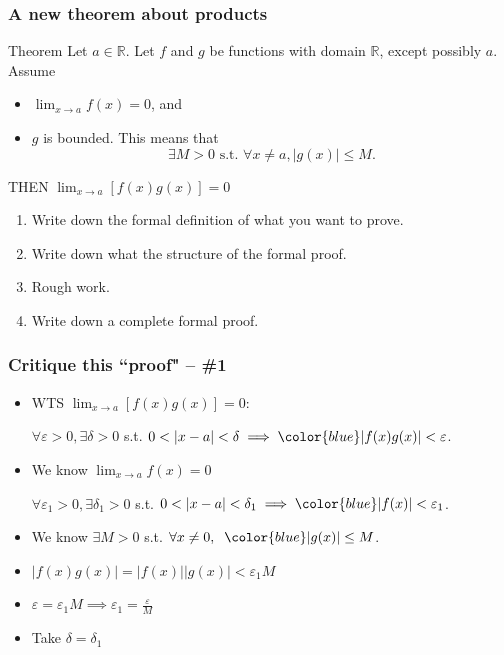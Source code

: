 \begin{frame}[t]
	\frametitle{A new theorem about products}
	\fontsize{13}{13}\selectfont
	\begin{block}{Theorem}
		Let $a \in \mathbb{R}$. Let $f$ and $g$ be functions with domain
		$\mathbb{R}$, except possibly $a$. Assume
		\begin{itemize}
			\item $\displaystyle \lim_{x \to a}f(x) = 0$, and

			\item $g$ is bounded. This means that
				\[
					\exists M >0 \text{ s.t. }\forall x \neq a, |g(x)| \leq M.
				\]
		\end{itemize}
		THEN $\displaystyle \lim_{x \to a}\left[ f(x) g(x) \right] = 0$
	\end{block}

	\vfill
	\begin{enumerate}

		\item Write down the formal definition of what you want to prove.

		\item Write down what the structure of the formal proof.

		\item Rough work.

		\item Write down a complete formal proof.
	\end{enumerate}
	\vfill
\end{frame}

\begin{frame}[t]
	\frametitle{Critique this ``proof" -- \#1}
	\fontsize{13}{13}\selectfont
	\begin{itemize}
		\item WTS $\displaystyle \lim_{x \to a}\left[ f(x) g(x) \right] = 0$:

			\hfill $\displaystyle \forall \varepsilon>0, \exists \delta>0$ \; s.t. \;
			$\displaystyle 0<|x-a|<\delta \implies{\color{blue} |f(x) g(x)| < \varepsilon}$.
			\vfill

		\item We know $\displaystyle \lim_{x \to a}f(x) = 0$

			\hfill $\displaystyle \forall \varepsilon_{1}>0, \exists \delta_{1}>0$ \;
			s.t. \; $\displaystyle 0<|x-a|<\delta_{1}\implies{\color{blue} |f(x)| <\varepsilon_1}$.
			\vfill

		\item We know \hfill $\displaystyle \exists M>0$ \; s.t. \;
			$\displaystyle \forall x \neq 0, \; \;{\color{blue} |g(x)| \leq M}$.
			\vfill

		\item $\displaystyle |f(x)g(x)| = |f(x)||g(x)| < \varepsilon_{1}M$
			\vfill

		\item $\displaystyle \varepsilon = \varepsilon_{1}M \implies \varepsilon_{1}=
			\frac{\varepsilon}{M}$
			\vfill

		\item Take $\displaystyle \delta = \delta_{1}$
			\vfill
	\end{itemize}
\end{frame}

